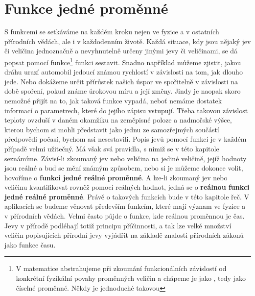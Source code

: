 \setchaptertoc
\chapter{Funkce jedné proměnné}\label{mai:IchapIII}
  \small
  S funkcemi se setkáváme na každém kroku nejen ve fyzice a v ostatních přírodních vědách, ale i v
  každodenním životě. Každá situace, kdy jsou nějaký jev či veličina jednoznačně a nevyhnutelně
  určeny jinými jevy či veličinami, se dá popsat pomocí funkce\footnote{V matematice abstrahujeme
  při zkoumání funkcionálních závislostí od konkrétní fyzikální povahy proměnných veličin a chápeme
  je jako , tedy jako číselné proměnné. Někdy je jednoduché takovou} funkci
  sestavit. Snadno například můžeme zjistit, jakou dráhu urazí automobil jedoucí známou rychlostí v
  závislosti na tom, jak dlouho jede. Nebo dokážeme určit přírůstek našich úspor ve spořitelně v
  závislosti na době spoření, pokud známe úrokovou míru a její změny. Jindy je naopak skoro nemožné
  přijít na to, jak taková funkce vypadá, neboť nemáme dostatek informací o parametrech, které do
  jejího zápisu vstupují. Třeba takovou závislost teploty ovzduší v daném okamžiku na zeměpisné
  poloze a nadmořské výšce, kterou bychom si mohli představit jako jednu ze samozřejmých součástí
  předpovědi počasí, bychom asi nesestavili. Popis jevů pomocí funkcí je v každém případě velmi
  užitečný. Má však svá pravidla, s nimiž se v této kapitole seznámíme. Závisí-li zkoumaný jev nebo
  veličina na jediné veličině, jejíž hodnoty jsou reálné a buď se mění známým způsobem, nebo si je
  můžeme dokonce volit, hovoříme o \textbf{funkci jedné reálné proměnné}. A lze-li zkoumaný jev nebo
  veličinu kvantifikovat rovněž pomocí reálných hodnot, jedná se o \textbf{reálnou funkci jedné
  reálné proměnné}. Právě o takových funkcích bude v této kapitole řeč. V aplikacích se budeme
  věnovat především funkcím, které mají význam ve fyzice a v přírodních vědách. Velmi často půjde o
  funkce, kde reálnou proměnnou je čas. Jevy v přírodě podléhají totiž principu příčinnosti, a tak
  lze velké množství veličin popisujících přírodní jevy vyjádřit na základě znalosti přírodních
  zákonů jako funkce času. 
  \cite[s.~53]{Musilova2009MA1}
  \normalsize
